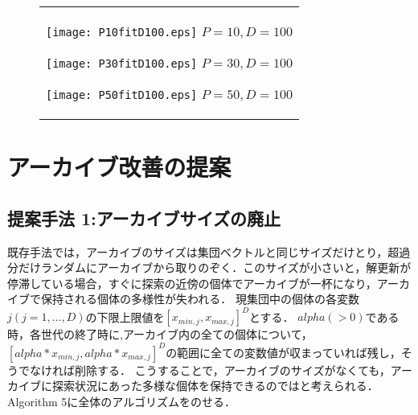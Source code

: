 \documentclass[a4paper,11pt,oneside,openany]{jsbook}
\begin{document}
\begin{figure}[htbp]
  \begin{center}
    \begin{tabular}{c}

      \begin{minipage}{0.33\hsize}
        \begin{center}
          \texttt{[image: P10fitD100.eps]}
          \hspace{1.2cm} $P=10, D=100$
        \end{center}
      \end{minipage}

      \begin{minipage}{0.33\hsize}
        \begin{center}
          \texttt{[image: P30fitD100.eps]}
          \hspace{1.2cm} $P=30, D=100$
        \end{center}
      \end{minipage}

      \begin{minipage}{0.33\hsize}
        \begin{center}
          \texttt{[image: P50fitD100.eps]}
          \hspace{1.2cm} $P=50, D=100$
        \end{center}
      \end{minipage}
    \end{tabular}
    \label{fig:lena}
  \end{center}
\end{figure}

\chapter{アーカイブ改善の提案}
\section{提案手法 1:アーカイブサイズの廃止}
既存手法では，アーカイブのサイズは集団ベクトルと同じサイズだけとり，超過分だけランダムにアーカイブから取りのぞく．このサイズが小さいと，解更新が停滞している場合，すぐに探索の近傍の個体でアーカイブが一杯になり，アーカイブで保持される個体の多様性が失われる．
現集団中の個体の各変数$j(j = 1,...,D)$の下限上限値を$[x_{min,j},x_{max,j}]^D$とする．
$alpha(>0)$である時，各世代の終了時に,アーカイブ内の全ての個体について，$[alpha *x_{min,j},alpha*x_{max,j}]^D$の範囲に全ての変数値が収まっていれば残し，そうでなければ削除する．
こうすることで，アーカイブのサイズがなくても，アーカイブに探索状況にあった多様な個体を保持できるのではと考えられる．Algorithm 5に全体のアルゴリズムをのせる．
\end{document}
